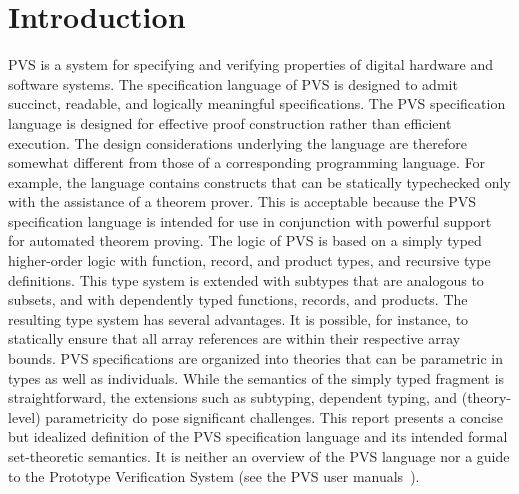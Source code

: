 \documentclass [12pt,twoside]{cslreport}
\begin{document}
\chapter{Introduction} \label{introduction} PVS is a system for specifying
and verifying properties of digital hardware and software systems.  The
specification language of PVS is designed to admit succinct, readable, and
logically meaningful specifications.  The PVS specification language is
designed for effective proof construction rather than efficient execution.
The design considerations underlying the language are therefore somewhat
different from those of a corresponding programming language.  For
example, the language contains constructs that can be statically
typechecked only with the assistance of a theorem prover.  This is
acceptable because the PVS specification language is intended for use in
conjunction with powerful support for automated theorem proving.  The
logic of PVS is based on a simply typed higher-order logic with function,
record, and product types, and recursive type definitions.  This type
system is extended with subtypes that are analogous to subsets, and with
dependently typed functions, records, and products.  The resulting type
system has several advantages.  It is possible, for instance, to
statically ensure that all array references are within their respective
array bounds.  PVS specifications are organized into theories that can be
parametric in types as well as individuals.  While the semantics of the
simply typed fragment is straightforward, the extensions such as
subtyping, dependent typing, and (theory-level) parametricity do pose
significant challenges.  This report presents a concise but idealized
definition of the PVS specification language and its intended formal
set-theoretic semantics.  It is neither an overview of the PVS language
nor a guide to the Prototype Verification System (see the PVS user
manuals~\cite{PVS:manuals}).
\end{document}
